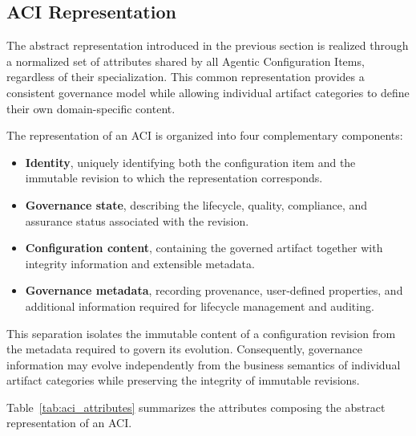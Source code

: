 \documentclass[10pt]{article}
\begin{document}
\subsection{ACI Representation}
\label{sec:configuration_item_representation}

The abstract representation introduced in the previous section is realized through a normalized set of attributes shared by all Agentic Configuration Items, regardless of their specialization. This common representation provides a consistent governance model while allowing individual artifact categories to define their own domain-specific content.

The representation of an ACI is organized into four complementary components:

\begin{itemize}

\item \textbf{Identity}, uniquely identifying both the configuration item and the immutable revision to which the representation corresponds.

\item \textbf{Governance state}, describing the lifecycle, quality, compliance, and assurance status associated with the revision.

\item \textbf{Configuration content}, containing the governed artifact together with integrity information and extensible metadata.

\item \textbf{Governance metadata}, recording provenance, user-defined properties, and additional information required for lifecycle management and auditing.

\end{itemize}

This separation isolates the immutable content of a configuration revision from the metadata required to govern its evolution. Consequently, governance information may evolve independently from the business semantics of individual artifact categories while preserving the integrity of immutable revisions.

Table~\ref{tab:aci_attributes} summarizes the attributes composing the abstract representation of an ACI.
\end{document}
